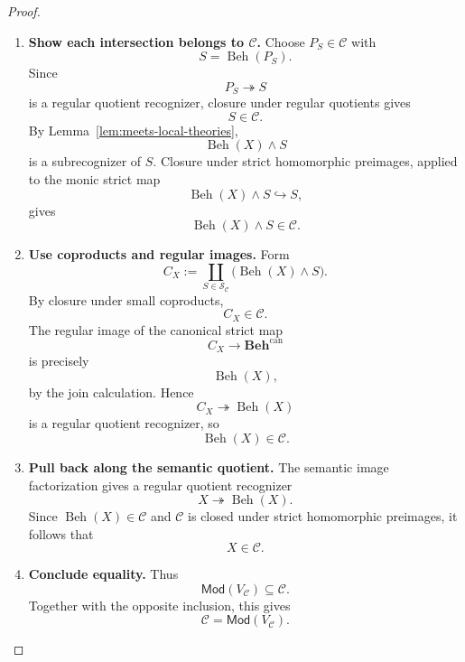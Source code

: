 \begin{proof}
\begin{enumerate}
        \item \textbf{Show each intersection belongs to \(\mathcal C\).}
        Choose \(P_S\in\mathcal C\) with
        \[
            S=\operatorname{Beh}(P_S).
        \]
        Since
        \[
            P_S\twoheadrightarrow S
        \]
        is a regular quotient recognizer, closure under regular quotients gives
        \[
            S\in\mathcal C.
        \]
        By Lemma~\ref{lem:meets-local-theories},
        \[
            \operatorname{Beh}(X)\wedge S
        \]
        is a subrecognizer of \(S\). Closure under strict homomorphic preimages,
        applied to the monic strict map
        \[
            \operatorname{Beh}(X)\wedge S\hookrightarrow S,
        \]
        gives
        \[
            \operatorname{Beh}(X)\wedge S\in\mathcal C.
        \]

        \item \textbf{Use coproducts and regular images.}
        Form
        \[
            C_X:=
            \coprod_{S\in\mathcal S_{\mathcal C}}
            \bigl(\operatorname{Beh}(X)\wedge S\bigr).
        \]
        By closure under small coproducts,
        \[
            C_X\in\mathcal C.
        \]
        The regular image of the canonical strict map
        \[
            C_X\to\mathbf{Beh}^{\mathrm{can}}
        \]
        is precisely
        \[
            \operatorname{Beh}(X),
        \]
        by the join calculation. Hence
        \[
            C_X\twoheadrightarrow\operatorname{Beh}(X)
        \]
        is a regular quotient recognizer, so
        \[
            \operatorname{Beh}(X)\in\mathcal C.
        \]

        \item \textbf{Pull back along the semantic quotient.}
        The semantic image factorization gives a regular quotient recognizer
        \[
            X\twoheadrightarrow\operatorname{Beh}(X).
        \]
        Since \(\operatorname{Beh}(X)\in\mathcal C\) and \(\mathcal C\) is
        closed under strict homomorphic preimages, it follows that
        \[
            X\in\mathcal C.
        \]

        \item \textbf{Conclude equality.}
        Thus
        \[
            \mathsf{Mod}(V_{\mathcal C})\subseteq\mathcal C.
        \]
        Together with the opposite inclusion, this gives
        \[
            \mathcal C=\mathsf{Mod}(V_{\mathcal C}).
        \]
    \end{enumerate}
\end{proof}

